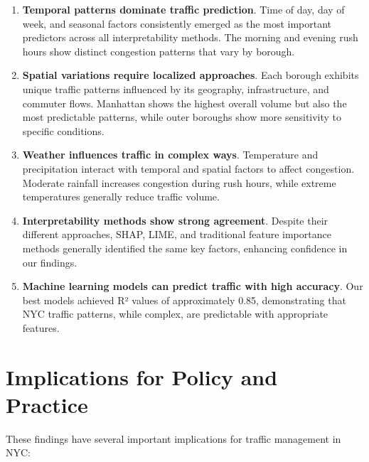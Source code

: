 \documentclass[
  letterpaper,
  DIV=11,
  numbers=noendperiod]{scrreprt}
\begin{document}
\begin{enumerate}
\def\labelenumi{\arabic{enumi}.}
\item
  \textbf{Temporal patterns dominate traffic prediction}. Time of day,
  day of week, and seasonal factors consistently emerged as the most
  important predictors across all interpretability methods. The morning
  and evening rush hours show distinct congestion patterns that vary by
  borough.
\item
  \textbf{Spatial variations require localized approaches}. Each borough
  exhibits unique traffic patterns influenced by its geography,
  infrastructure, and commuter flows. Manhattan shows the highest
  overall volume but also the most predictable patterns, while outer
  boroughs show more sensitivity to specific conditions.
\item
  \textbf{Weather influences traffic in complex ways}. Temperature and
  precipitation interact with temporal and spatial factors to affect
  congestion. Moderate rainfall increases congestion during rush hours,
  while extreme temperatures generally reduce traffic volume.
\item
  \textbf{Interpretability methods show strong agreement}. Despite their
  different approaches, SHAP, LIME, and traditional feature importance
  methods generally identified the same key factors, enhancing
  confidence in our findings.
\item
  \textbf{Machine learning models can predict traffic with high
  accuracy}. Our best models achieved R² values of approximately 0.85,
  demonstrating that NYC traffic patterns, while complex, are
  predictable with appropriate features.
\end{enumerate}

\section{Implications for Policy and
Practice}\label{implications-for-policy-and-practice}

These findings have several important implications for traffic
management in NYC:
\end{document}
